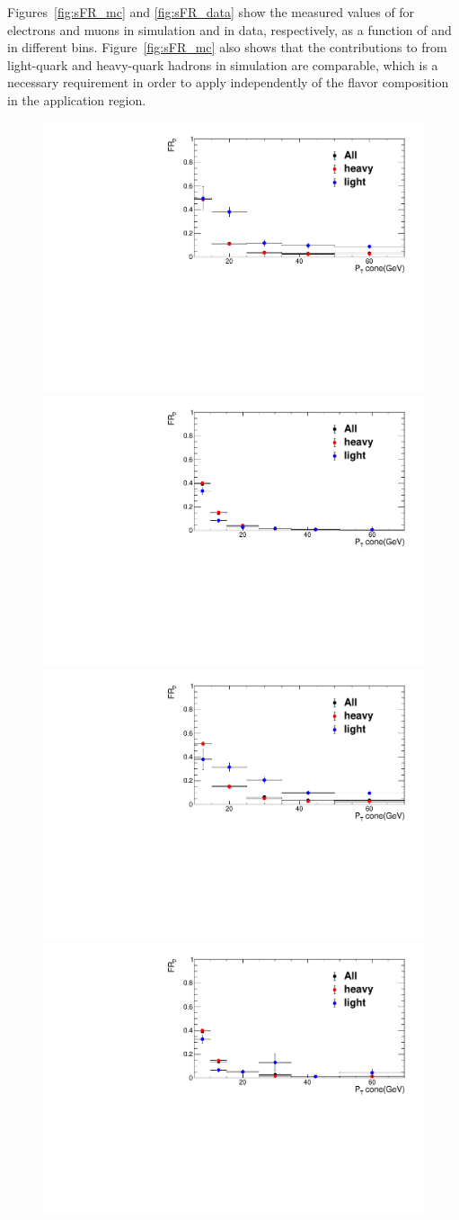 Figures~\ref{fig:sFR_mc} and \ref{fig:sFR_data} show the measured
values of \sfr for electrons and muons in simulation and in data,
respectively, as a function of \ptc and in different \abseta bins.
Figure~\ref{fig:sFR_mc} also shows that the contributions to \sfr from
light-quark and heavy-quark hadrons in simulation are comparable,
which is a necessary requirement in order to apply \sfr independently
of the flavor composition in the application region.
\begin{figure}[t!]
  \centering
  \includegraphics[width=.48\textwidth]{Figures/c6/backgrounds/FR/sFR/QCD/LeptonPt_ele_eta1_FR2.pdf}
  \hfill{}
  \includegraphics[width=.48\textwidth]{Figures/c6/backgrounds/FR/sFR/QCD/LeptonPt_mu_eta1_FR2.pdf}\\
  \includegraphics[width=.48\textwidth]{Figures/c6/backgrounds/FR/sFR/QCD/LeptonPt_ele_eta2_FR2.pdf}
  \hfill{}
  \includegraphics[width=.48\textwidth]{Figures/c6/backgrounds/FR/sFR/QCD/LeptonPt_mu_eta2_FR2.pdf}\\

\end{figure}

